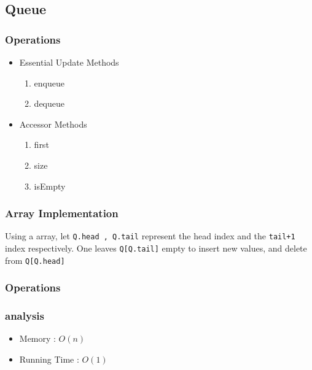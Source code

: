 \subsection{Queue}



		\subsubsection{Operations}
				\begin{itemize}
						\item Essential Update Methods
						\begin{enumerate}
								\item enqueue
								\item dequeue
						\end{enumerate}
				\end{itemize}
				\begin{itemize}
						\item Accessor Methods
						\begin{enumerate}
								\item first
								\item size
								\item isEmpty
						\end{enumerate}
				\end{itemize}
				
		\subsubsection{Array Implementation}
				
				\par{Using a  array, let \texttt{Q.head , Q.tail} represent the head index and the \texttt{tail+1} index respectively. One leaves \texttt{Q[Q.tail]} empty to insert new values, and delete from \texttt{Q[Q.head]}}

		\subsubsection{Operations}


		\subsubsection{analysis}
			\begin{itemize}
				\item[] Memory : $O(n)$
				\item[] Running Time : $O(1)$
			\end{itemize}	

